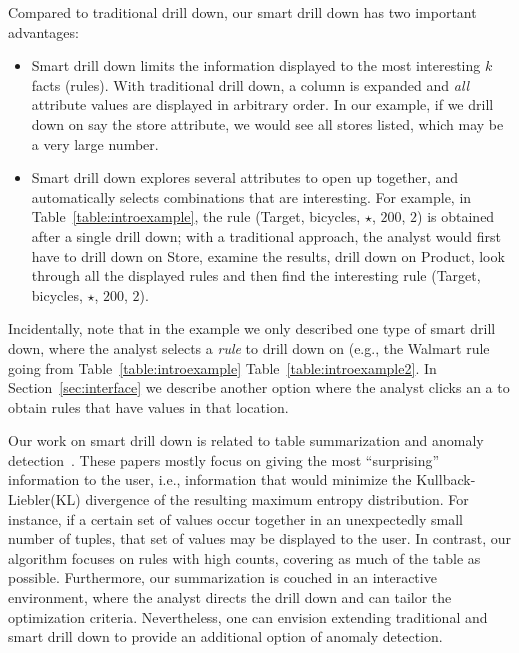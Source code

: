 Compared to traditional drill down, our smart drill down has two important advantages:
\begin{itemize}
\item
Smart drill down limits the information displayed
to the most interesting $k$ facts (rules).
With traditional drill down, a column is expanded and {\em all}
attribute values are displayed in arbitrary order.
In our example, if we drill down on say the store attribute,
we would see all stores listed, which may be a very large number.
\item
Smart drill down explores several attributes to open up together,
and automatically selects combinations that are interesting.
For example, in Table~\ref{table:introexample},
the rule (Target, bicycles, $\star$, $200$, $2$)
is obtained after a single drill down;
with a traditional approach, the analyst would first have to drill down on
Store, examine the results, drill down on Product,
look through all the displayed rules and then find the interesting rule
(Target, bicycles, $\star$, $200$, $2$).
\end{itemize}

Incidentally, note that in the example we only described one type of smart drill down,
where the analyst selects a {\em rule} to drill down on
(e.g., the Walmart rule going from Table~\ref{table:introexample}
Table~\ref{table:introexample2}.
In Section~\ref{sec:interface} we describe another option
where the analyst clicks an a {\em *} to obtain
rules that have values in that location.

Our work on smart drill down is related
to table summarization and anomaly
detection~\cite{Sarawagi:2001:UMA:767141.767148,
Sarawagi00user-adaptiveexploration,
Sarawagi98discovery-drivenexploration,
DBLP:journals/pvldb/GebalyAGKS14}.
These papers mostly focus on
giving the most ``surprising'' information to the user, i.e., information
that would minimize the Kullback-Liebler(KL) divergence of the
resulting maximum entropy distribution. For instance, if a certain set of
values occur together in an unexpectedly small number of tuples, that
set of values may be displayed to the user. In contrast, our algorithm
focuses on rules with high counts, covering as
much of the table as possible.
Furthermore, our summarization is couched in
an interactive environment, where the analyst
directs the drill down and can tailor the optimization criteria.
Nevertheless, one can envision extending traditional
and smart drill down to provide an additional option of anomaly detection.

